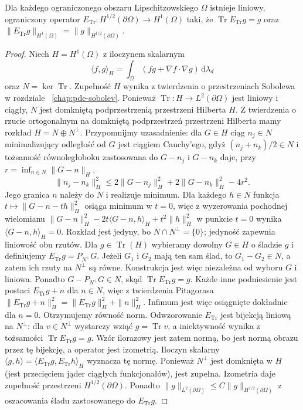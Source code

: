 \begin{lemat}
\label{lem:pde10-halftrace-rightinverse}
Dla każdego ograniczonego obszaru Lipschitzowskiego $\Omega$
istnieje liniowy, ograniczony operator
$E_{\operatorname{Tr}}:H^{1/2}(\partial\Omega)\to H^1(\Omega)$
taki, że $\operatorname{Tr}E_{\operatorname{Tr}}g=g$ oraz
$\|E_{\operatorname{Tr}}g\|_{H^1(\Omega)}
=\|g\|_{H^{1/2}(\partial\Omega)}$.
\end{lemat}
\begin{proof}
Niech $H=H^1(\Omega)$ z iloczynem skalarnym
\[
 \langle f,g\rangle_H=\int_\Omega
 (fg+\nabla f\cdot\nabla g)\,\mathrm d\lambda_d
\]
oraz $N=\ker\operatorname{Tr}$. Zupełność $H$ wynika
z twierdzenia o przestrzeniach Sobolewa w rozdziale
~\ref{chap:pde-sobolev}. Ponieważ $\operatorname{Tr}:H\to L^2(\partial\Omega)$
jest liniowy i ciągły, $N$ jest domkniętą podprzestrzenią
przestrzeni Hilberta $H$. Z twierdzenia o rzucie
ortogonalnym na domkniętą podprzestrzeń przestrzeni
Hilberta mamy rozkład $H=N\oplus N^\perp$.
Przypomnijmy uzasadnienie: dla $G\in H$ ciąg $n_j\in N$
minimalizujący odległość od $G$ jest ciągiem Cauchy'ego,
gdyż $(n_j+n_k)/2\in N$ i tożsamość równoległoboku
zastosowana do $G-n_j$ i $G-n_k$ daje, przy
$r=\inf_{n\in N}\|G-n\|_H$,
\[
 \|n_j-n_k\|_H^2
 \le 2\|G-n_j\|_H^2+2\|G-n_k\|_H^2-4r^2.
\]
Jego granica $n$ należy do $N$ i realizuje minimum.
Dla każdego $h\in N$ funkcja
$t\mapsto\|G-n-th\|_H^2$ osiąga minimum w $t=0$,
więc z wyzerowania pochodnej wielomianu
$\|G-n\|_H^2-2t\langle G-n,h\rangle_H+t^2\|h\|_H^2$
w punkcie $t=0$ wynika $\langle G-n,h\rangle_H=0$.
Rozkład jest jedyny, bo $N\cap N^\perp=\{0\}$;
jedyność zapewnia liniowość obu rzutów.
Dla $g\in\operatorname{Tr}(H)$ wybieramy dowolny $G\in H$
o śladzie $g$ i definiujemy
$E_{\operatorname{Tr}}g=P_{N^\perp}G$.
Jeżeli $G_1$ i $G_2$ mają ten sam ślad, to
$G_1-G_2\in N$, a zatem ich rzuty na $N^\perp$ są równe.
Konstrukcja jest więc niezależna od wyboru $G$ i liniowa.
Ponadto $G-P_{N^\perp}G\in N$, skąd
$\operatorname{Tr}E_{\operatorname{Tr}}g=g$.
Każde inne podniesienie jest postaci
$E_{\operatorname{Tr}}g+n$ dla $n\in N$, więc
z twierdzenia Pitagorasa
$\|E_{\operatorname{Tr}}g+n\|_H^2
=\|E_{\operatorname{Tr}}g\|_H^2+\|n\|_H^2$.
Infimum jest więc osiągnięte dokładnie dla $n=0$.
Otrzymujemy równość norm. Odwzorowanie
$E_{\operatorname{Tr}}$ jest bijekcją liniową na
$N^\perp$: dla $v\in N^\perp$ wystarczy wziąć
$g=\operatorname{Tr}v$, a iniektywność wynika
z tożsamości $\operatorname{Tr}E_{\operatorname{Tr}}g=g$.
Wzór ilorazowy jest zatem normą, bo jest normą
obrazu przez tę bijekcję, a operator jest izometrią.
Iloczyn skalarny
$\langle g,h\rangle=\langle E_{\operatorname{Tr}}g,
E_{\operatorname{Tr}}h\rangle_H$ wyznacza tę normę.
Ponieważ $N^\perp$ jest domknięta w $H$
(jest przecięciem jąder ciągłych funkcjonałów),
jest zupełna. Izometria daje zupełność przestrzeni
$H^{1/2}(\partial\Omega)$.
Ponadto $\|g\|_{L^2(\partial\Omega)}
\le C\|g\|_{H^{1/2}(\partial\Omega)}$ z oszacowania śladu
zastosowanego do $E_{\operatorname{Tr}}g$.
\end{proof}

